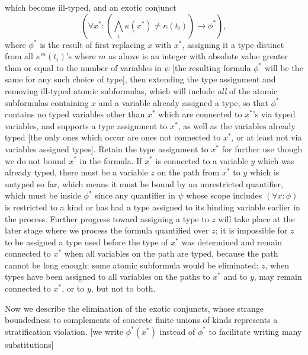 \documentclass[12pt]{article}
\begin{document}
which become ill-typed, and an exotic conjunct $$(\forall x^*:(\bigwedge_i \kappa(x^*) \neq \kappa(t_i))\rightarrow \phi^*),$$ where $\phi^*$ is the result of first replacing $x$ with $x^*$, assigning it a type distinct from all $\kappa^m(t_i)$'s where $m$ as above is an integer with absolute value greater than or equal to the number of variables in $\psi$ [the resulting formula $\phi^*$ will be the same for any such choice of type], then extending the type assignment and removing ill-typed atomic subformulas, which will include  {\em all\/} of the atomic subformulas containing $x$ and a variable already assigned a type, so that $\phi^*$ contains no typed variables other than $x^*$ which are connected to $x^*$'s via typed variables, and supports a type assignment to $x^*$, as well as the variables already typed [the only ones which occur are ones not connected to $x^*$, or at least not via variables assigned types].  Retain the type assignment to $x^*$ for further use though we do not bound $x^*$ in the formula.  If $x^*$ is connected to a variable $y$ which was already typed, there must be a variable $z$ on the path from $x^*$ to $y$ which is untyped so far, which means it must be bound by an unrestricted quantifier, which must be inside $\phi^*$ since any quantifier in $\psi$ whose scope includes $(\forall x:\phi)$ is restricted to a kind or has had a type assigned to its binding variable earlier in the process.   Further progress toward assigning a type to $z$ will take place at the later stage where we process the formula quantified over $z$; it is impossible for $z$ to be assigned a type used before the type of $x^*$ was determined and remain connected to $x^*$ when all variables on the path are typed, because the path cannot be long enough: some atomic subformula would be eliminated:   $z$, when types have been assigned to all variables on the paths to $x^*$ and to $y$, may remain connected to $x^*$, or to $y$, but not to both.

Now we describe the elimination of the exotic conjuncts, whose strange boundedness to complements of concrete finite unions of kinds represents a stratification violation. [we write $\phi^*(x^*)$ instead of $\phi^*$ to facilitate writing many substitutions]  
\end{document}
